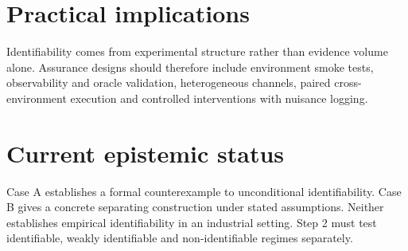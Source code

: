 \documentclass[11pt]{article}
\begin{document}
\section{Practical implications}
Identifiability comes from experimental structure rather than evidence volume alone. Assurance designs should therefore include environment smoke tests, observability and oracle validation, heterogeneous channels, paired cross-environment execution and controlled interventions with nuisance logging.

\section{Current epistemic status}
Case A establishes a formal counterexample to unconditional identifiability. Case B gives a concrete separating construction under stated assumptions. Neither establishes empirical identifiability in an industrial setting. Step 2 must test identifiable, weakly identifiable and non-identifiable regimes separately.
\end{document}
